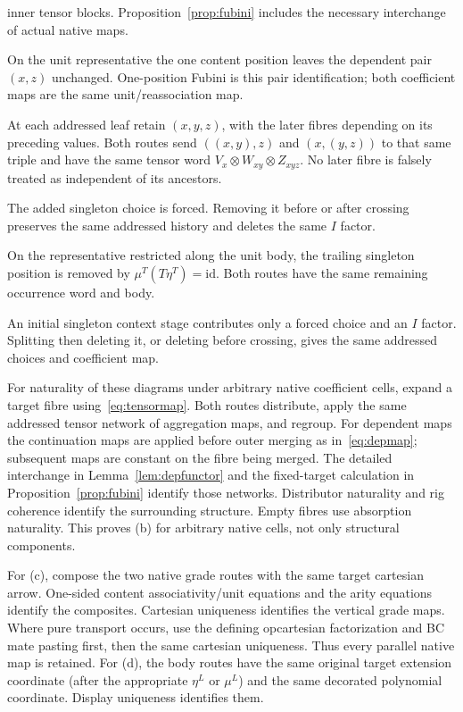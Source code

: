 \documentclass[11pt,a4paper]{article}
\theoremstyle{definition}
\newcommand{\id}{\mathrm{id}}
\begin{document}
\begin{description}[style=nextline]
inner tensor blocks. Proposition~\ref{prop:fubini} includes the necessary
interchange of actual native maps.
\item[C6 content unit against context multiplication.]
On the unit representative the one content position leaves the dependent pair
$(x,z)$ unchanged. One-position Fubini is this pair identification; both
coefficient maps are the same unit/reassociation map.
\item[C7 context associativity on $NMMM$.]
At each addressed leaf retain $(x,y,z)$, with the later fibres depending on
its preceding values. Both routes send $((x,y),z)$ and $(x,(y,z))$ to that
same triple and have the same tensor word $V_x\otimes W_{xy}\otimes Z_{xyz}$.
No later fibre is falsely treated as independent of its ancestors.
\item[C8 context right unit.]
The added singleton choice is forced. Removing it before or after crossing
preserves the same addressed history and deletes the same $I$ factor.
\item[C9 content right unit.]
On the representative restricted along the unit body, the trailing singleton
position is removed by $\mu^T(T\eta^T)=\id$. Both routes have the same
remaining occurrence word and body.
\item[C10 context left unit.]
An initial singleton context stage contributes only a forced choice and an
$I$ factor. Splitting then deleting it, or deleting before crossing, gives
the same addressed choices and coefficient map.
\end{description}

For naturality of these diagrams under arbitrary native coefficient cells,
expand a target fibre using~\eqref{eq:tensormap}. Both routes distribute,
apply the same addressed tensor network of aggregation maps, and regroup.
For dependent maps the continuation maps are applied before outer merging as
in~\eqref{eq:depmap}; subsequent maps are constant on the fibre being merged.
The detailed interchange in Lemma~\ref{lem:depfunctor} and the fixed-target
calculation in Proposition~\ref{prop:fubini} identify those networks.
Distributor naturality and rig coherence identify the surrounding structure.
Empty fibres use absorption naturality. This proves (b) for arbitrary native
cells, not only structural components.

For (c), compose the two native grade routes with the same target cartesian
arrow. One-sided content associativity/unit equations and the arity equations
identify the composites. Cartesian uniqueness identifies the vertical grade
maps. Where pure transport occurs, use the defining opcartesian factorization
and BC mate pasting first, then the same cartesian uniqueness. Thus every
parallel native map is retained. For (d), the body routes have the same
original target extension coordinate (after the appropriate $\eta^L$ or
$\mu^L$) and the same decorated polynomial coordinate. Display uniqueness
identifies them.
\end{document}
